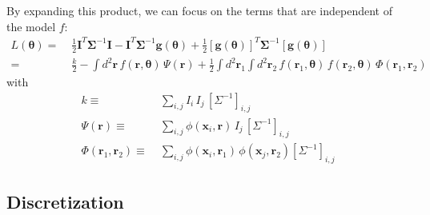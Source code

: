 \documentclass[10pt]{article}
\begin{document}
By expanding this product, we can focus on the terms that are independent of the model $f$:
\begin{align}
L(\bm{\theta})
    =\;& \frac{1}{2}\bm{I}^T\bm{\Sigma}^{-1}\bm{I}
        - \bm{I}^T\bm{\Sigma}^{-1}\bm{g}(\bm{\theta})
        + \frac{1}{2}\left[\bm{g}(\bm{\theta})\right]^T\bm{\Sigma}^{-1}
            \left[\bm{g}(\bm {\theta})\right] \\
    =\;& \frac{k}{2}
        - \int\!d^2 \bm{r}\,
                f(\bm{r},\bm{\theta}) \,
                \Psi(\bm{r})
        + \frac{1}{2}
            \int\!d^2\bm{r}_1 \int\!d^2\bm{r}_2 \,
                f(\bm{r}_1,\bm{\theta}) \, f(\bm{r}_2,\bm{\theta}) \,
                \Phi(\bm{r}_1,\bm{r}_2)
\label{eqn:lik-expansion}
\end{align}
with
\begin{align}
k \equiv\;& \sum_{i,j} I_i\, I_j\, \left[\Sigma^{-1}\right]_{i,j}
    \label{eqn:k-def}\\
\Psi(\bm{r}) \equiv\;& \sum_{i,j}
    \phi(\bm{x}_i,\bm{r}) \, I_j \, \left[\Sigma^{-1}\right]_{i,j}
    \label{eqn:psi-def}
    \\
\Phi(\bm{r}_1,\bm{r}_2) \equiv\;&
    \sum_{i,j}
        \phi(\bm{x}_i,\bm{r}_1) \, \phi(\bm{x}_j,\bm{r}_2)
        \left[\Sigma^{-1}\right]_{i,j}
\label{eqn:phi-def}
\end{align}

\subsection{Discretization}
\end{document}
